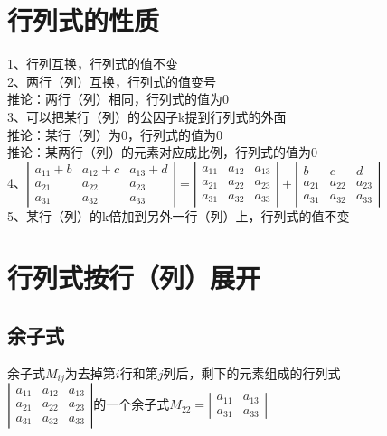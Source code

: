 \documentclass{article}
\begin{document}
\begin{flushleft}
	\section{行列式的性质}
	1、行列互换，行列式的值不变\\
	2、两行（列）互换，行列式的值变号\\
	\qquad 推论：两行（列）相同，行列式的值为0\\
	3、可以把某行（列）的公因子k提到行列式的外面\\
	\qquad 推论：某行（列）为0，行列式的值为0\\
	\qquad 推论：某两行（列）的元素对应成比例，行列式的值为0\\
	4、$\left|\begin{array}{cccc} 
	a_{11}+b&a_{12}+c&a_{13}+d\\ 
	a_{21}&a_{22}&a_{23}\\
	a_{31}&a_{32}&a_{33}
	\end{array}\right|=\left|\begin{array}{cccc} 
	a_{11}&a_{12}&a_{13}\\ 
	a_{21}&a_{22}&a_{23}\\
	a_{31}&a_{32}&a_{33}
	\end{array}\right|+\left|\begin{array}{cccc} 
	b&c&d\\ 
	a_{21}&a_{22}&a_{23}\\
	a_{31}&a_{32}&a_{33}
	\end{array}\right|$\\
	5、某行（列）的k倍加到另外一行（列）上，行列式的值不变\\
	
	\section{行列式按行（列）展开}
	
	\subsection{余子式}
	余子式$M_{ij}$为去掉第$i$行和第$j$列后，剩下的元素组成的行列式\\
	$\left|\begin{array}{cccc} 
	a_{11}&a_{12}&a_{13}\\ 
	a_{21}&a_{22}&a_{23}\\
	a_{31}&a_{32}&a_{33}
	\end{array}\right|$的一个余子式$M_{22}=\left|\begin{array}{cccc} 
	a_{11}&a_{13}\\
	a_{31}&a_{33}
	\end{array}\right|$\\
	

\end{flushleft}
\end{document}
